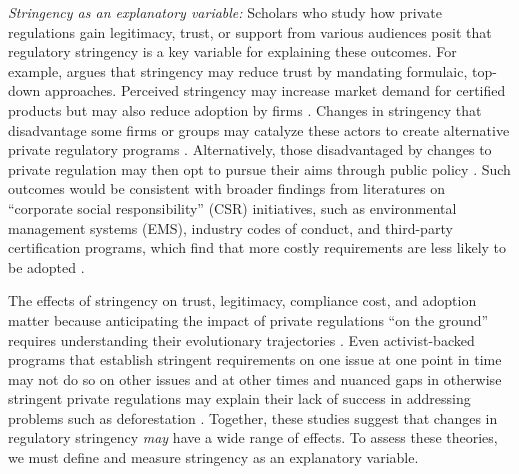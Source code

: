 \documentclass[
      12pt,
            Review ]{article}
\begin{document}
\emph{Stringency as an explanatory variable:} Scholars who study how private regulations gain legitimacy, trust, or support from various audiences posit that regulatory stringency is a key variable for explaining these outcomes. For example, \citet{McDermott2012} argues that stringency may reduce trust by mandating formulaic, top-down approaches. Perceived stringency may increase market demand for certified products \citep{Atkinson2014} but may also reduce adoption by firms \citep{Prado2013}. Changes in stringency that disadvantage some firms or groups may catalyze these actors to create alternative private regulatory programs \citep{Meidinger2003}. Alternatively, those disadvantaged by changes to private regulation may then opt to pursue their aims through public policy \citep{Weimer2006}. Such outcomes would be consistent with broader findings from literatures on ``corporate social responsibility'' (CSR) initiatives, such as environmental management systems (EMS), industry codes of conduct, and third-party certification programs, which find that more costly requirements are less likely to be adopted \citep{Delmas2008, Kollman2001, Lyon2008}.

The effects of stringency on trust, legitimacy, compliance cost, and adoption matter because anticipating the impact of private regulations ``on the ground'' requires understanding their evolutionary trajectories \citep{VanderVen2018}. Even activist-backed programs that establish stringent requirements on one issue at one point in time may not do so on other issues and at other times \citep{LeBaron2018} and nuanced gaps in otherwise stringent private regulations may explain their lack of success in addressing problems such as deforestation \citep{VanderVen2018}. Together, these studies suggest that changes in regulatory stringency \emph{may} have a wide range of effects. To assess these theories, we must define and measure stringency as an explanatory variable.
\end{document}

